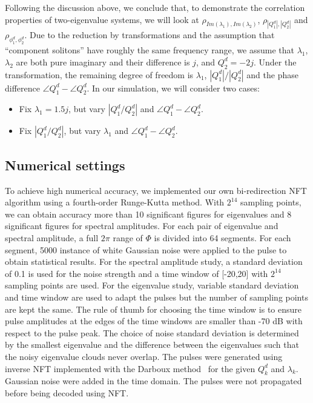\documentclass[9pt,twocolumn,twoside]{osajnl}
\begin{document}
Following the discussion above, we conclude that, to demonstrate the correlation properties of two-eigenvalue systems, we will look at $\rho_{Im(\lambda_1),Im(\lambda_2)}$, $\rho_{|Q^d_1|,|Q^d_2|}$ and $\rho_{\phi^d_1,\phi^d_2}$. Due to the reduction by transformations and the assumption that ``component solitons'' have roughly the same frequency range, we assume that $\lambda_1$, $\lambda_2$ are both pure imaginary and their difference is $j$, and $Q_2^d=-2j$. Under the transformation, the remaining degree of freedom is $\lambda_1$, $|Q^d_1|/|Q^d_2|$ and the phase difference $\angle Q^d_1-\angle Q^d_2$. In our simulation, we will consider two cases:
\begin{itemize}[topsep=0pt,itemsep=0pt,partopsep=0pt,parsep=0pt]
	\item  Fix $\lambda_1 = 1.5j$, but vary $|Q^d_1/Q^d_2|$ and $\angle Q^d_1-\angle Q^d_2$.
	\item  Fix $|Q^d_1/Q^d_2|$, but vary $\lambda_1$ and $\angle Q^d_1-\angle Q^d_2$.
\end{itemize}

\subsection{Numerical settings}
To achieve high numerical accuracy, we implemented our own bi-redirection NFT algorithm using a fourth-order Runge-Kutta method. With $2^{14}$ sampling points, we can obtain accuracy more than 10 significant figures for eigenvalues and 8 significant figures for spectral amplitudes. For each pair of eigenvalue and spectral amplitude, a full $2\pi$ range of $\Phi$ is divided into 64 segments. For each segment, 5000 instance of white Gaussian noise were applied to the pulse to obtain statistical results. For the spectral amplitude study, a standard deviation of 0.1 is used for the noise strength and a time window of [-20,20] with $2^{14}$ sampling points are used. For the eigenvalue study, variable standard deviation and time window are used to adapt the pulses but the number of sampling points are kept the same. The rule of thumb for choosing the time window is to ensure pulse amplitudes at the edges of the time windows are smaller than -70 dB with respect to the pulse peak. The choice of noise standard deviation is determined by the smallest eigenvalue and the difference between the eigenvalues such that the noisy eigenvalue clouds never overlap. The pulses were generated using inverse NFT implemented with the Darboux method~\cite{yousefi_information_2014-1} for the given $Q^d_k$ and $\lambda_k$. Gaussian noise were added in the time domain. The pulses were not propagated before being decoded using NFT.
\end{document}
